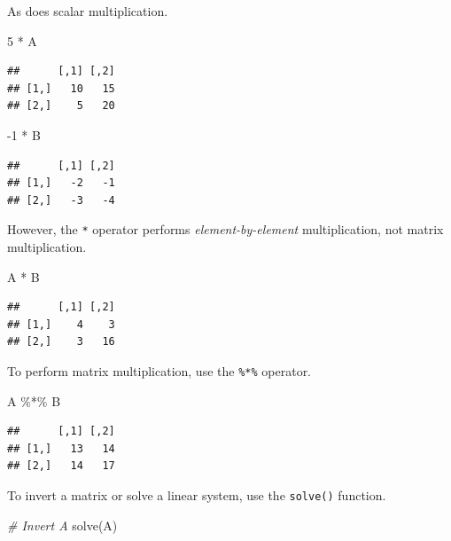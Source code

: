 \documentclass[
  12pt,
  oneside,openany]{book}
\newenvironment{Shaded}{\begin{snugshade}}{\end{snugshade}}
\newcommand{\CommentTok}[1]{\textcolor[rgb]{0.56,0.35,0.01}{\textit{#1}}}
\newcommand{\DecValTok}[1]{\textcolor[rgb]{0.00,0.00,0.81}{#1}}
\newcommand{\FunctionTok}[1]{\textcolor[rgb]{0.00,0.00,0.00}{#1}}
\newcommand{\NormalTok}[1]{#1}
\newcommand{\SpecialCharTok}[1]{\textcolor[rgb]{0.00,0.00,0.00}{#1}}
\begin{document}
As does scalar multiplication.

\begin{Shaded}
\begin{Highlighting}[]
\DecValTok{5} \SpecialCharTok{*}\NormalTok{ A}
\end{Highlighting}
\end{Shaded}

\begin{verbatim}
##      [,1] [,2]
## [1,]   10   15
## [2,]    5   20
\end{verbatim}

\begin{Shaded}
\begin{Highlighting}[]
\SpecialCharTok{{-}}\DecValTok{1} \SpecialCharTok{*}\NormalTok{ B}
\end{Highlighting}
\end{Shaded}

\begin{verbatim}
##      [,1] [,2]
## [1,]   -2   -1
## [2,]   -3   -4
\end{verbatim}

However, the \texttt{*} operator performs \emph{element-by-element} multiplication, not matrix multiplication.

\begin{Shaded}
\begin{Highlighting}[]
\NormalTok{A }\SpecialCharTok{*}\NormalTok{ B}
\end{Highlighting}
\end{Shaded}

\begin{verbatim}
##      [,1] [,2]
## [1,]    4    3
## [2,]    3   16
\end{verbatim}

To perform matrix multiplication, use the \texttt{\%*\%} operator.

\begin{Shaded}
\begin{Highlighting}[]
\NormalTok{A }\SpecialCharTok{\%*\%}\NormalTok{ B}
\end{Highlighting}
\end{Shaded}

\begin{verbatim}
##      [,1] [,2]
## [1,]   13   14
## [2,]   14   17
\end{verbatim}

To invert a matrix or solve a linear system, use the \texttt{solve()} function.

\begin{Shaded}
\begin{Highlighting}[]
\CommentTok{\# Invert A}
\FunctionTok{solve}\NormalTok{(A)}
\end{Highlighting}
\end{Shaded}
\end{document}
